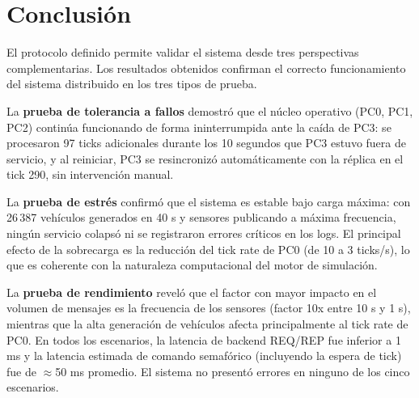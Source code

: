 \documentclass[12pt, a4paper]{article}
\begin{document}
\section{Conclusión}

El protocolo definido permite validar el sistema desde tres perspectivas complementarias. Los resultados obtenidos confirman el correcto funcionamiento del sistema distribuido en los tres tipos de prueba.

La \textbf{prueba de tolerancia a fallos} demostró que el núcleo operativo (PC0, PC1, PC2) continúa funcionando de forma ininterrumpida ante la caída de PC3: se procesaron 97 ticks adicionales durante los 10 segundos que PC3 estuvo fuera de servicio, y al reiniciar, PC3 se resincronizó automáticamente con la réplica en el tick 290, sin intervención manual.

La \textbf{prueba de estrés} confirmó que el sistema es estable bajo carga máxima: con 26\,387 vehículos generados en 40 s y sensores publicando a máxima frecuencia, ningún servicio colapsó ni se registraron errores críticos en los logs. El principal efecto de la sobrecarga es la reducción del tick rate de PC0 (de 10 a 3 ticks/s), lo que es coherente con la naturaleza computacional del motor de simulación.

La \textbf{prueba de rendimiento} reveló que el factor con mayor impacto en el volumen de mensajes es la frecuencia de los sensores (factor 10x entre 10 s y 1 s), mientras que la alta generación de vehículos afecta principalmente al tick rate de PC0. En todos los escenarios, la latencia de backend REQ/REP fue inferior a 1 ms y la latencia estimada de comando semafórico (incluyendo la espera de tick) fue de $\approx$50 ms promedio. El sistema no presentó errores en ninguno de los cinco escenarios.
\end{document}
